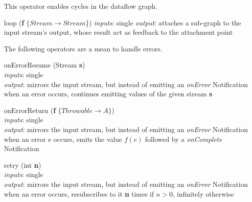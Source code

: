 \documentclass{dithesis}
\begin{document}
This operator enables cycles in the dataflow graph.
\begin{description}

\begin{minipage}[c]{\lll}
\item[loop] (\textbf{f} $\{ Stream \to Stream \}$)
	\textit{inputs}: single
	\textit{output}: attaches a sub-graph to the input stream's output, whose result act as feedback to the attachment point
\end{minipage}
\hfill
\begin{minipage}[c]{\rrr}

\end{minipage}
\newline \newline \newline
\end{description}

The following operators are a mean to handle errors.
\begin{description}

\begin{minipage}[c]{\lll}
\item[onErrorResume] (Stream \textbf{s})\\
	\textit{inputs}: single \\
	\textit{output}: mirrors the input stream, but instead of emitting an \textit{onError} Notification when an error occurs, continues emitting values of the given stream \textbf{s}
\end{minipage}
\hfill
\newline \newline \newline
\begin{minipage}[c]{\lll}
\item[onErrorReturn] (\textbf{f} $\{ Throwable \to A \}$)\\
	\textit{inputs}: single \\
	\textit{output}: mirrors the input stream, but instead of emitting an \textit{onError} Notification when an error e occurs, emits the value $f(e)$ followed by a \textit{onComplete} Notification
\end{minipage}
\hfill
\begin{minipage}[c]{\rrr}

\end{minipage}
\newline \newline \newline
\begin{minipage}[c]{\lll}
\item[retry] (int \textbf{n})\\
	\textit{inputs}: single \\
	\textit{output}: mirrors the input stream, but instead of emitting an \textit{onError} Notification when an error occurs, resubscribes to it \textbf{n} times if $n > 0$, infinitely otherwise
\end{minipage}
\hfill
\newline \newline \newline
\end{description}
\end{document}
